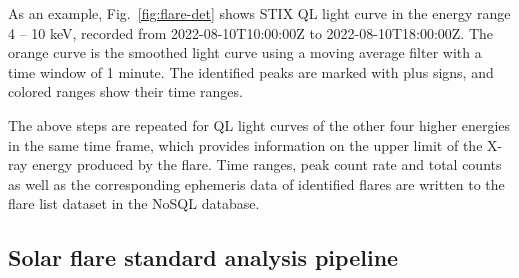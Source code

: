 \documentclass[referee]{aa} %
\begin{document}
As an example, Fig.~\ref{fig:flare-det}  shows  STIX QL  light curve  in the energy range 4 -- 10 keV, recorded from 
2022-08-10T10:00:00Z to 2022-08-10T18:00:00Z.  The orange curve is the smoothed light curve using a moving average filter with a time window
of 1 minute. 
The identified peaks are marked with plus signs, and colored ranges show their time ranges.

The above steps are repeated for QL light curves of the other four higher energies
in the same time frame, which provides information on the upper limit of the X-ray energy produced by the flare.
Time ranges, peak count rate and total counts as well as the corresponding ephemeris data of identified flares are 
written to the flare list dataset in the NoSQL database.


\subsection{Solar flare standard analysis pipeline}
\end{document}
